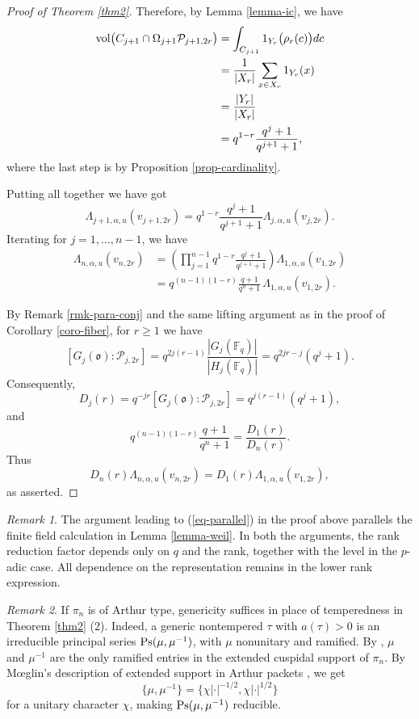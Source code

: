 \documentclass[12pt]{amsart}
\theoremstyle{definition}
\theoremstyle{remark}
\newtheorem{remark}{Remark}
\begin{document}
\begin{proof}[Proof of Theorem \ref{thm2}]
Therefore, by Lemma \ref{lemma-ic}, we have
\begin{align*}
{\rm vol}\bigl(
C_{j+1}\cap\Omega_{j+1}\mathcal P_{j+1,2r}
\bigr)
&=\int_{C_{j+1}} 1_{Y_r}\bigl(\rho_r(c)\bigr)dc\\
&=\frac{1}{|X_r|}\sum_{x\in X_r} 1_{Y_r}(x)\\
&=\frac{|Y_r|}{|X_r|}\\
&=q^{1-r}\frac{q^j+1}{q^{j+1}+1},
\end{align*}
where the last step is by Proposition \ref{prop-cardinality}.

Putting all together we have got 
\[
\Lambda_{j+1,\alpha,u}(v_{j+1,2r})
=
q^{1-r}\frac{q^j+1}{q^{j+1}+1}
\Lambda_{j,\alpha,u}(v_{j,2r}).
\]
Iterating for $j=1,\ldots,n-1$, we have
\begin{align*}
\Lambda_{n,\alpha,u}(v_{n,2r})
&=
\left(\prod_{j=1}^{n-1}
q^{1-r}\frac{q^j+1}{q^{j+1}+1}\right)
\Lambda_{1,\alpha,u}(v_{1,2r})\\
&=
q^{(n-1)(1-r)}
\frac{q+1}{q^n+1}\,
\Lambda_{1,\alpha,u}(v_{1,2r}).
\end{align*}

By Remark \ref{rmk-para-conj} and the same lifting argument as in the proof of Corollary \ref{coro-fiber}, for $r\ge1$ we have
\[
[G_j(\mathfrak o):\mathcal P_{j,2r}]
=
q^{2j(r-1)}
\frac{|G_j(\mathbb F_q)|}{|H_j(\mathbb F_q)|}
=
q^{2jr-j}(q^j+1).
\]
Consequently,
\[
D_j(r)=q^{-jr}[G_j(\mathfrak o):\mathcal P_{j,2r}]
=q^{j(r-1)}(q^j+1),
\]
and
\[
q^{(n-1)(1-r)}\frac{q+1}{q^n+1}
=\frac{D_1(r)}{D_n(r)}.
\]
Thus
\[
D_n(r)\Lambda_{n,\alpha,u}(v_{n,2r})
=
D_1(r)\Lambda_{1,\alpha,u}(v_{1,2r}),
\]
as asserted.
\end{proof}

\begin{remark}
The argument leading to (\ref{eq-parallel}) in the proof above parallels the finite field calculation in Lemma \ref{lemma-weil}. In both the arguments, the rank reduction factor depends only on $q$ and the rank, together with the level in the $p$-adic case. All dependence on the representation remains in the lower rank expression.
\end{remark}

\begin{remark}\label{moeglin}
If $\pi_n$ is of Arthur type, genericity suffices in place of temperedness in Theorem \ref{thm2} (2). Indeed, a generic nontempered $\tau$ with $a(\tau)>0$ is an irreducible principal series ${\rm Ps}(\mu,\mu^{-1})$, with $\mu$ nonunitary and ramified. By \cite[Chapter III, §4, Proposition 4.1(iii)]{kud96}, $\mu$ and $\mu^{-1}$ are the only ramified entries in the extended cuspidal support of $\pi_n$. By Mœglin’s description of extended support in Arthur packets \cite[§4.1, Proposition on p. 814]{moe09}, we get
\[
\{\mu,\mu^{-1}\}
=
\{\chi|\cdot|^{-1/2},\chi|\cdot|^{1/2}\}
\]
for a unitary character $\chi$, making ${\rm Ps}(\mu,\mu^{-1})$ reducible.
\end{remark}
\end{document}
